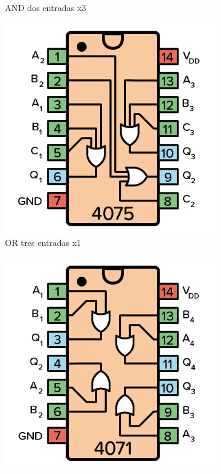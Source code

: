 \begin{center}
\begin{figure}[h!]
\begin{subfigure}[b]{0.45\linewidth}
\caption{AND dos entradas x3}
\end{subfigure}
\begin{subfigure}[c]{0.45\linewidth}
\includegraphics[width=\linewidth]{./imagenes/cd4075.png}
\caption{OR tres entradas x1}
\end{subfigure}
\begin{subfigure}[d]{0.45\linewidth}
\includegraphics[width=\linewidth]{./imagenes/cd4071.png}

\end{subfigure}
\end{figure}
\end{center}
